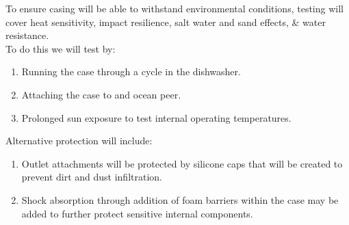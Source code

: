 \documentclass[12pt]{article}
\begin{document}
To ensure casing will be able to withstand environmental conditions, testing will cover heat sensitivity, impact resilience, salt water and sand effects, \& water resistance.\\  

To do this we will test by:
\begin{enumerate}
	\item	Running the case through a cycle in the dishwasher.
	\item	Attaching the case to and ocean peer.
	\item   Prolonged sun exposure to test internal operating temperatures.   

	\end{enumerate}
	
Alternative protection will include:
\begin{enumerate}
	\item   Outlet attachments will be protected by silicone caps that will be created to prevent dirt and dust infiltration.
	\item   Shock absorption through addition of foam barriers within the case may be added to further protect sensitive internal components.\\
\end{enumerate}
\end{document}
